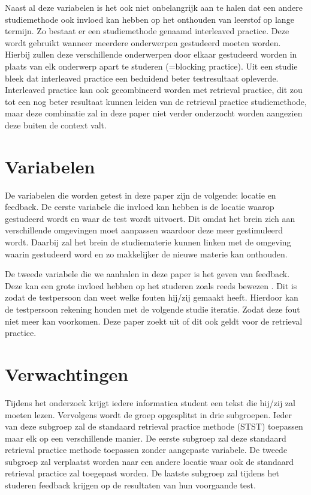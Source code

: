 \documentclass{hogent-article}
\begin{document}
    Naast al deze variabelen is het ook niet onbelangrijk aan te halen dat een andere studiemethode ook invloed kan hebben op het onthouden van leerstof op lange termijn. Zo bestaat er een studiemethode genaamd interleaved practice. Deze wordt gebruikt wanneer meerdere onderwerpen gestudeerd moeten worden. Hierbij zullen deze verschillende onderwerpen door elkaar gestudeerd worden in plaats van elk onderwerp apart te studeren (=blocking practice). Uit een studie \autocite{taylor2010effects} bleek dat interleaved practice een beduidend beter testresultaat opleverde. Interleaved practice kan ook gecombineerd worden met retrieval practice, dit zou tot een nog beter resultaat kunnen leiden van de retrieval practice studiemethode, maar deze combinatie zal in deze paper niet verder onderzocht worden aangezien deze buiten de context valt.
    
	
	\section{Variabelen}
    De variabelen die worden getest in deze paper zijn de volgende: locatie en feedback.
    De eerste variabele die invloed kan hebben is de locatie waarop gestudeerd wordt en waar de test wordt uitvoert. Dit omdat het brein zich aan verschillende omgevingen moet aanpassen waardoor deze meer gestimuleerd wordt. Daarbij zal het brein de studiematerie kunnen linken met de omgeving waarin gestudeerd word en zo makkelijker de nieuwe materie kan onthouden.
    
    De tweede variabele die we aanhalen in deze paper is het geven van feedback. Deze kan een grote invloed hebben op het studeren zoals reeds bewezen \autocite{roediger2011critical, brame2015test}.
    Dit is zodat de testpersoon dan weet welke fouten hij/zij gemaakt heeft. Hierdoor kan de testpersoon rekening houden met de volgende studie iteratie. Zodat deze fout niet meer kan voorkomen. 
    Deze paper zoekt uit of dit ook geldt voor de retrieval practice. 
    
    \section{Verwachtingen}
    Tijdens het onderzoek krijgt iedere informatica student een tekst die hij/zij zal moeten lezen. Vervolgens wordt de groep opgesplitst in drie subgroepen. Ieder van deze subgroep zal de standaard retrieval practice methode (STST) toepassen maar elk op een verschillende manier.
    De eerste subgroep zal deze standaard retrieval practice methode toepassen zonder aangepaste variabele. 
    De tweede subgroep zal verplaatst worden naar een andere locatie waar ook de standaard retrieval practice zal toegepast worden.
    De laatste subgroep zal tijdens het studeren feedback krijgen op de resultaten van hun voorgaande test.
    
\end{document}
